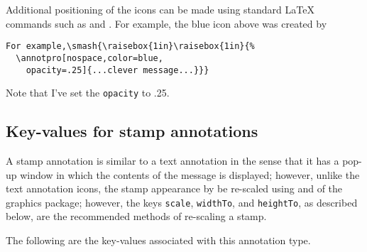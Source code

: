 \documentclass[12pt]{article}
\let\amtIndent\leftmargini
\edef\amtIndent{\the\parindent}
\begin{document}
\begin{itemize}
    Additional positioning of the icons can be made using standard {\LaTeX}
    commands such as  and . For example, the blue icon above was created by
\begin{Verbatim}[xleftmargin=\amtIndent,fontsize=\footnotesize]
For example,\smash{\raisebox{1in}\raisebox{1in}{%
  \annotpro[nospace,color=blue,
    opacity=.25]{...clever message...}}}
\end{Verbatim}
Note that I've set the \texttt{opacity} to .25.

\end{itemize}


\subsection{Key-values for stamp annotations}

A stamp annotation is similar to a text annotation in the sense that
it has a pop-up window in which the contents of the message is
displayed; however, unlike the text annotation icons, the stamp
appearance by be re-scaled using  and  of
the graphics package; however, the keys \texttt{scale},
\texttt{widthTo}, and \texttt{heightTo}, as described below, are the
recommended methods of re-scaling a stamp.

The following are the key-values associated with this annotation type.
\end{document}
